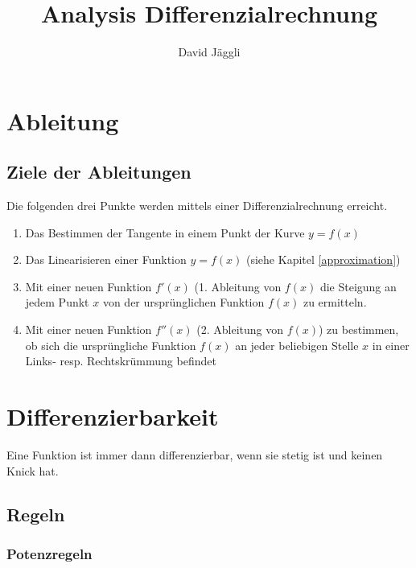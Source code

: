 \documentclass[12pt]{scrartcl}
\author{David Jäggli}
\title{Analysis Differenzialrechnung}
\begin{document}
\maketitle

\tableofcontents

\newpage


\section{Ableitung} 
\subsection{Ziele der Ableitungen}

Die folgenden drei Punkte werden mittels einer Differenzialrechnung erreicht.

\begin{enumerate}
    \item Das Bestimmen der Tangente in einem Punkt der Kurve $y=f(x)$
    \item Das Linearisieren einer Funktion $y=f(x)$ (siehe Kapitel \ref{approximation})
    \item Mit einer neuen Funktion $f'(x)$ (1. Ableitung von $f(x)$ die Steigung an jedem Punkt $x$ von der ursprünglichen Funktion $f(x)$ zu ermitteln.
    \item Mit einer neuen Funktion $f''(x)$ (2. Ableitung von $f(x)$) zu bestimmen, ob sich die ursprüngliche Funktion $f(x)$ an jeder beliebigen Stelle $x$ in einer Links- resp. Rechtskrümmung befindet
\end{enumerate}


\section{Differenzierbarkeit}
Eine Funktion ist immer dann differenzierbar, wenn sie stetig ist und keinen Knick 
hat.

\subsection{Regeln}
\subsubsection{Potenzregeln}
\end{document}
